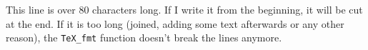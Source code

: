 \documentclass{article}
\begin{document}
This line is over 80 characters long. If I write it from the beginning, it will
be cut at the end. If it is too long (joined, adding some text afterwards or any
other reason), the \texttt{TeX_fmt} function doesn't break the lines anymore.
\end{document}
